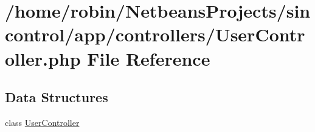 \hypertarget{_user_controller_8php}{}\section{/home/robin/\+Netbeans\+Projects/sincontrol/app/controllers/\+User\+Controller.php File Reference}
\label{_user_controller_8php}
\subsection*{Data Structures}
\begin{DoxyCompactItemize}
\item 
class \hyperlink{class_user_controller}{User\+Controller}
\end{DoxyCompactItemize}
